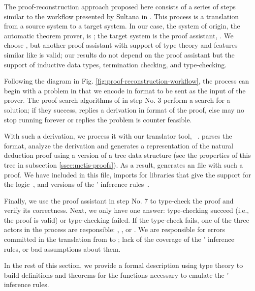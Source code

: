 \documentclass[../main.tex]{subfiles}
\begin{document}
The proof-reconstruction approach proposed here consists of a series
of steps similar to the workflow presented by Sultana in
\cite{sultana2015}. This process is a translation from a source
system to a target system. In our case, the system of origin, the
automatic theorem prover, is \Metis; the target system is the proof
assistant, \Agda. We choose \Agda, but another proof assistant with
support of type theory and features similar like \Agda is valid; our
results do not depend on the proof assistant but the support of
inductive data types, termination checking, and type-checking.

Following the diagram in Fig.
\ref{fig:proof-reconstruction-workflow}, the process can begin with
a problem in \CPL that we encode in \TPTP format to be sent as the
input of the \Metis prover.
The proof-search algorithms of \Metis in step No. 3 perform a
search for a solution; if they success, \Metis
replies a derivation in \TSTP format of the proof, else \Metis may
no stop running forever or replies the problem is counter feasible.

With such a derivation, we process it with our \Haskell translator
tool, \Athena~\cite{Athena}.
\Athena parses the \TSTP format, analyze the
derivation and generates a representation of the natural deduction
proof using a version of a tree data structure (see the properties
of this tree in subsection \ref{ssec:metis-proofs}). As a result,
\Athena generates an \Agda file with such a proof. We have included
in this file, imports for \Agda libraries that give the support for
the logic~\cite{AgdaProp}, and versions of the \Metis' inference
rules~\cite{AgdaMetis}.

Finally, we use the proof assistant in step No. 7 to type-check the
proof and verify its correctness. Next, we only have one answer:
type-checking succeed (i.e., the proof is valid) or type-checking failed.
If the type-check fails, one of the three actors in the process are
responsible: \Metis, \Athena, or \Agda. We are responsible for
errors committed in the translation from \TSTP to \Agda; lack of the
coverage of the \Metis' inference rules, or bad assumptions about
them. 

In the rest of this section, we provide a formal description using
type theory to build definitions and theorems for the functions
necessary to emulate the \Metis' inference rules.

\end{document}
